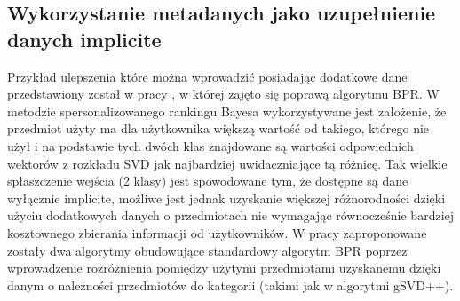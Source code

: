 \documentclass{pracamgr}
\begin{document}
   \subsection{Wykorzystanie metadanych jako uzupełnienie danych implicite}
    Przykład ulepszenia które można wprowadzić posiadając dodatkowe dane przedstawiony został w pracy \cite{191},
    w której zajęto się poprawą algorytmu BPR.\newline
    W metodzie spersonalizowanego rankingu Bayesa wykorzystywane jest założenie, że przedmiot użyty ma dla użytkownika większą wartość od takiego,
    którego nie użył i na podstawie tych dwóch klas znajdowane są wartości odpowiednich wektorów z rozkładu SVD jak najbardziej uwidaczniające tą różnicę.
    Tak wielkie spłaszczenie wejścia (2 klasy) jest spowodowane tym, że dostępne są dane wyłącznie implicite,
    możliwe jest jednak uzyskanie większej różnorodności dzięki użyciu dodatkowych danych o przedmiotach nie wymagając równocześnie bardziej kosztownego
    zbierania informacji od użytkowników.
    W pracy \cite{191} zaproponowane zostały dwa algorytmy obudowujące standardowy algorytm BPR poprzez wprowadzenie rozróżnienia pomiędzy użytymi przedmiotami
    uzyskanemu dzięki danym o należności przedmiotów do kategorii (takimi jak w algorytmi gSVD++).
\end{document}
